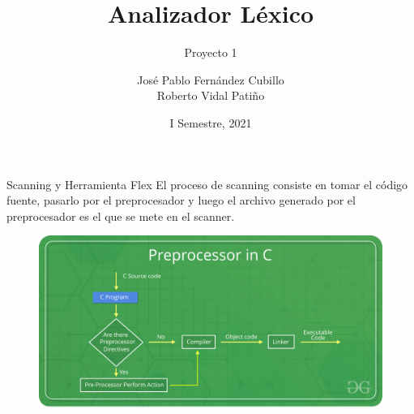 \documentclass[aspectratio=43]{beamer}
\title{Analizador Léxico}
\subtitle{Proyecto 1}
\author[José P. Fernández, Roberto Vidal]{
    José Pablo Fernández Cubillo%
    \\%
    Roberto Vidal Patiño%
}
\institute[Tecnológico de Costa Rica]{
    Tecnológico de Costa Rica%
    \\%
    Compiladores e Intérpretes%
}
\date{I Semestre, 2021}
\begin{document}
    
    \frame{\titlepage}
    
    \begin{frame}{Scanning y Herramienta Flex}
            El proceso de scanning consiste en tomar el código fuente, pasarlo por el preprocesador y luego el archivo generado por el preprocesador es el que se mete en el scanner. \\
            \begin{figure}[h]
                \centerline{\includegraphics[scale=.15]{preprocessor.png}}
            \end{figure}
    \end{frame}
    
\end{document}
